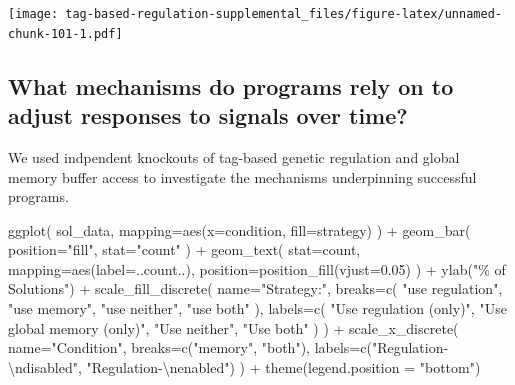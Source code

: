 \documentclass[
]{book}
\newenvironment{Shaded}{\begin{snugshade}}{\end{snugshade}}
\newcommand{\AttributeTok}[1]{\textcolor[rgb]{0.77,0.63,0.00}{#1}}
\newcommand{\FloatTok}[1]{\textcolor[rgb]{0.00,0.00,0.81}{#1}}
\newcommand{\FunctionTok}[1]{\textcolor[rgb]{0.00,0.00,0.00}{#1}}
\newcommand{\NormalTok}[1]{#1}
\newcommand{\SpecialCharTok}[1]{\textcolor[rgb]{0.00,0.00,0.00}{#1}}
\newcommand{\StringTok}[1]{\textcolor[rgb]{0.31,0.60,0.02}{#1}}
\begin{document}
\texttt{[image: tag-based-regulation-supplemental\_files/figure-latex/unnamed-chunk-101-1.pdf]}

\hypertarget{what-mechanisms-do-programs-rely-on-to-adjust-responses-to-signals-over-time-2}{%
\subsection{What mechanisms do programs rely on to adjust responses to signals over time?}\label{what-mechanisms-do-programs-rely-on-to-adjust-responses-to-signals-over-time-2}}

We used indpendent knockouts of tag-based genetic regulation and global memory buffer access to investigate the mechanisms underpinning successful programs.

\begin{Shaded}
\begin{Highlighting}[]
\FunctionTok{ggplot}\NormalTok{( sol\_data, }\AttributeTok{mapping=}\FunctionTok{aes}\NormalTok{(}\AttributeTok{x=}\NormalTok{condition, }\AttributeTok{fill=}\NormalTok{strategy) ) }\SpecialCharTok{+}
  \FunctionTok{geom\_bar}\NormalTok{(}
    \AttributeTok{position=}\StringTok{"fill"}\NormalTok{,}
    \AttributeTok{stat=}\StringTok{"count"}
\NormalTok{  ) }\SpecialCharTok{+}
  \FunctionTok{geom\_text}\NormalTok{(}
    \AttributeTok{stat=}\StringTok{\textquotesingle{}count\textquotesingle{}}\NormalTok{,}
    \AttributeTok{mapping=}\FunctionTok{aes}\NormalTok{(}\AttributeTok{label=}\NormalTok{..count..),}
    \AttributeTok{position=}\FunctionTok{position\_fill}\NormalTok{(}\AttributeTok{vjust=}\FloatTok{0.05}\NormalTok{)}
\NormalTok{  ) }\SpecialCharTok{+}
  \FunctionTok{ylab}\NormalTok{(}\StringTok{"\% of Solutions"}\NormalTok{) }\SpecialCharTok{+}
  \FunctionTok{scale\_fill\_discrete}\NormalTok{(}
    \AttributeTok{name=}\StringTok{"Strategy:"}\NormalTok{,}
    \AttributeTok{breaks=}\FunctionTok{c}\NormalTok{(}
      \StringTok{"use regulation"}\NormalTok{,}
      \StringTok{"use memory"}\NormalTok{,}
      \StringTok{"use neither"}\NormalTok{,}
      \StringTok{"use both"}
\NormalTok{    ),}
    \AttributeTok{labels=}\FunctionTok{c}\NormalTok{(}
      \StringTok{"Use regulation (only)"}\NormalTok{,}
      \StringTok{"Use global memory (only)"}\NormalTok{,}
      \StringTok{"Use neither"}\NormalTok{,}
      \StringTok{"Use both"}
\NormalTok{    )}
\NormalTok{  ) }\SpecialCharTok{+}
  \FunctionTok{scale\_x\_discrete}\NormalTok{(}
    \AttributeTok{name=}\StringTok{"Condition"}\NormalTok{,}
    \AttributeTok{breaks=}\FunctionTok{c}\NormalTok{(}\StringTok{"memory"}\NormalTok{, }\StringTok{"both"}\NormalTok{),}
    \AttributeTok{labels=}\FunctionTok{c}\NormalTok{(}\StringTok{"Regulation{-}}\SpecialCharTok{\textbackslash{}n}\StringTok{disabled"}\NormalTok{, }\StringTok{"Regulation{-}}\SpecialCharTok{\textbackslash{}n}\StringTok{enabled"}\NormalTok{)}
\NormalTok{  ) }\SpecialCharTok{+}
  \FunctionTok{theme}\NormalTok{(}\AttributeTok{legend.position =} \StringTok{"bottom"}\NormalTok{)}
\end{Highlighting}
\end{Shaded}
\end{document}
